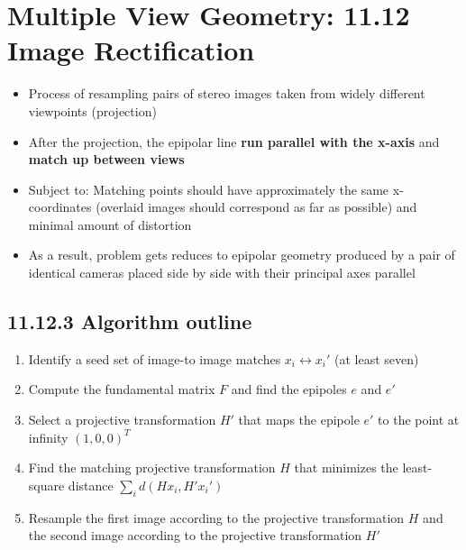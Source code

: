 \documentclass[a4paper]{article}
\begin{document}
\section{Multiple View Geometry: 11.12 Image Rectification}
\begin{itemize}
    \item
        Process of resampling pairs of stereo images taken from widely different viewpoints (projection)
    \item
        After the projection, the epipolar line \textbf{run parallel with the x-axis} and \textbf{match up between views}
    \item
        Subject to: Matching points should have approximately the same x-coordinates (overlaid images should correspond as far as possible) and minimal amount of distortion
    \item
        As a result, problem gets reduces to epipolar geometry produced by a pair of identical cameras placed side by side with their principal axes parallel
\end{itemize}

\subsection{11.12.3 Algorithm outline}
\begin{enumerate}
    \item
        Identify a seed set of image-to image matches \(x_i \leftrightarrow x_i'\) (at least seven)
    \item
        Compute the fundamental matrix \(F\) and find the epipoles \(e\) and \(e'\)
    \item
        Select a projective transformation \(H'\) that maps the epipole \(e'\) to the point at infinity \((1,0,0)^T\)
    \item
        Find the matching projective transformation \(H\) that minimizes the least-square distance \(\sum_i d(H x_i, H'x_i')\)
    \item
        Resample the first image according to the projective transformation \(H\) and the second image according to the projective transformation \(H'\)
\end{enumerate}
\end{document}
